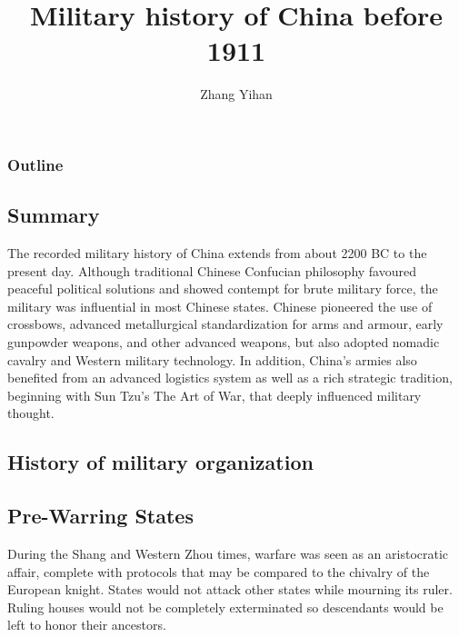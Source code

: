 \documentclass[compress]{beamer}
\begin{document}
\title{Military history of China before 1911}
\author{Zhang Yihan}
\date{}

\begin{frame}
\titlepage
\end{frame}

\begin{frame}
\frametitle{Outline}
\tableofcontents
\end{frame}

\begin{frame}
\section{Summary}
The recorded military history of China extends from about 2200 BC to the present day. Although traditional Chinese Confucian philosophy favoured peaceful political solutions and showed contempt for brute military force, the military was influential in most Chinese states. Chinese pioneered the use of crossbows, advanced metallurgical standardization for arms and armour, early gunpowder weapons, and other advanced weapons, but also adopted nomadic cavalry and Western military technology. In addition, China's armies also benefited from an advanced logistics system as well as a rich strategic tradition, beginning with Sun Tzu's The Art of War, that deeply influenced military thought.
\end{frame}

\begin{frame}
\section{History of military organization}
\subsection{Pre-Warring States}
During the Shang and Western Zhou times, warfare was seen as an aristocratic affair, complete with protocols that may be compared to the chivalry of the European knight. States would not attack other states while mourning its ruler. Ruling houses would not be completely exterminated so descendants would be left to honor their ancestors.
\end{frame}
\end{document}
